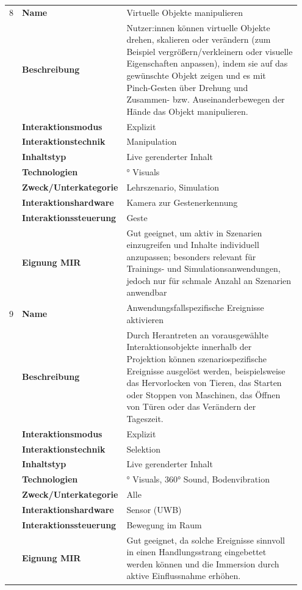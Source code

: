 \begin{longtable}{p{0.03\linewidth} p{0.27\linewidth}
    >{\raggedright\arraybackslash}p{0.65\linewidth}}
    8   & \textbf{Name} & Virtuelle Objekte manipulieren \\
        & \textbf{Beschreibung} & Nutzer:innen können virtuelle Objekte drehen, skalieren oder verändern (zum Beispiel vergrößern/verkleinern oder visuelle Eigenschaften anpassen), indem sie auf das gewünschte Objekt zeigen und es mit Pinch-Gesten über Drehung und Zusammen- bzw. Auseinanderbewegen der Hände das Objekt manipulieren. \\
        & \textbf{Interaktionsmodus} & Explizit \\
        & \textbf{Interaktionstechnik} & Manipulation \\
        & \textbf{Inhaltstyp} & Live gerenderter Inhalt \\
        & \textbf{Technologien} & 270° Visuals \\
        & \textbf{Zweck/Unterkategorie} & Lehrszenario, Simulation \\
        & \textbf{Interaktionshardware} & Kamera zur Gestenerkennung \\
        & \textbf{Interaktionssteuerung} & Geste \\
        & \textbf{Eignung MIR} & Gut geeignet, um aktiv in Szenarien einzugreifen und Inhalte individuell anzupassen; besonders relevant für Trainings- und Simulationsanwendungen, jedoch nur für schmale Anzahl an Szenarien anwendbar \\
    \midrule

    9   & \textbf{Name} & Anwendungsfallspezifische Ereignisse aktivieren \\
        & \textbf{Beschreibung} & Durch Herantreten an vorausgewählte Interaktionsobjekte innerhalb der Projektion können szenariospezifische Ereignisse ausgelöst werden, beispielsweise das Hervorlocken von Tieren, das Starten oder Stoppen von Maschinen, das Öffnen von Türen oder das Verändern der Tageszeit. \\
        & \textbf{Interaktionsmodus} & Explizit \\
        & \textbf{Interaktionstechnik} & Selektion \\
        & \textbf{Inhaltstyp} & Live gerenderter Inhalt \\
        & \textbf{Technologien} & 270° Visuals, 360° Sound, Bodenvibration \\
        & \textbf{Zweck/Unterkategorie} & Alle \\
        & \textbf{Interaktionshardware} & Sensor (UWB) \\
        & \textbf{Interaktionssteuerung} & Bewegung im Raum \\
        & \textbf{Eignung MIR} & Gut geeignet, da solche Ereignisse sinnvoll in einen Handlungsstrang eingebettet werden können und die Immersion durch aktive Einflussnahme erhöhen. \\
    \midrule


\end{longtable}
